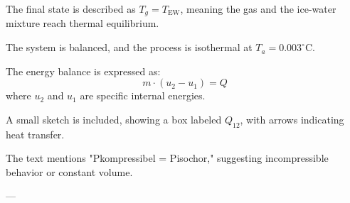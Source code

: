 The final state is described as \( T_g = T_{\text{EW}} \), meaning the gas and the ice-water mixture reach thermal equilibrium.  

The system is balanced, and the process is isothermal at \( T_a = 0.003^\circ \text{C} \).  

The energy balance is expressed as:  
\[
m \cdot (u_2 - u_1) = Q  
\]  
where \( u_2 \) and \( u_1 \) are specific internal energies.  

A small sketch is included, showing a box labeled \( Q_{12} \), with arrows indicating heat transfer.  

The text mentions "Pkompressibel = Pisochor," suggesting incompressible behavior or constant volume.  

---